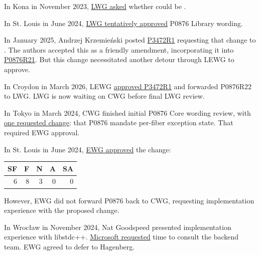 \label{wg21_history}

In Kona in November
2023, \href{https://wiki.edg.com/bin/view/Wg21kona2023/P0876-20231108}{LWG
asked} whether \canresume could be .

In St. Louis in June 2024,
\href{https://docs.google.com/document/d/1ebdFai3h2Y4g5NayNf_pG6Gl2qidYdF6G-smMWNw-Go/edit?tab=t.0#heading=h.9aqgmrf0hvh1}{LWG tentatively approved}
P0876 Library wording.

In January 2025, Andrzej Krzemieński
posted \href{https://www.open-std.org/jtc1/sc22/wg21/docs/papers/2025/p3472r1.html}{P3472R1}
requesting that change to \canresume. The authors accepted this as a friendly amendment, incorporating it
into \href{https://www.open-std.org/jtc1/sc22/wg21/docs/papers/2025/p0876r21.pdf}{P0876R21}.
But this change necessitated another detour through LEWG to approve.

In Croydon in March 2026,
LEWG \href{https://github.com/cplusplus/papers/issues/2126}{approved P3472R1}
and forwarded P0876R22 to LWG. LWG is now waiting on CWG before final LWG review.

In Tokyo in March 2024, CWG finished initial P0876 Core wording review, with
\href{https://wiki.edg.com/bin/view/Wg21tokyo2024/CoreWorkingGroup#D0876R16_fiber_context}{one requested change}:
that P0876 mandate per-fiber exception state. That required EWG approval.

In St. Louis in June 2024,
\href{https://wiki.edg.com/bin/view/Wg21stlouis2024/NotesEWGP0876}{EWG approved} the change:

\begin{table}[ht]
\begin{tabular}{|r|r|r|r|r|} %
\hline %
SF & F & N & A & SA \\ [0.5ex] %
\hline %
6 & 8 & 3 & 0 & 0 \\ %
\hline %
\end{tabular}
\end{table}

However, EWG did not forward P0876 back to CWG, requesting implementation
experience with the proposed change.

In Wrocław in November 2024, Nat Goodspeed presented implementation experience
with libstdc++.
\href{https://wiki.edg.com/bin/view/Wg21wroclaw2024/NotesEWGP0876}{Microsoft requested}
time to consult the backend team. EWG agreed to defer to Hagenberg.

